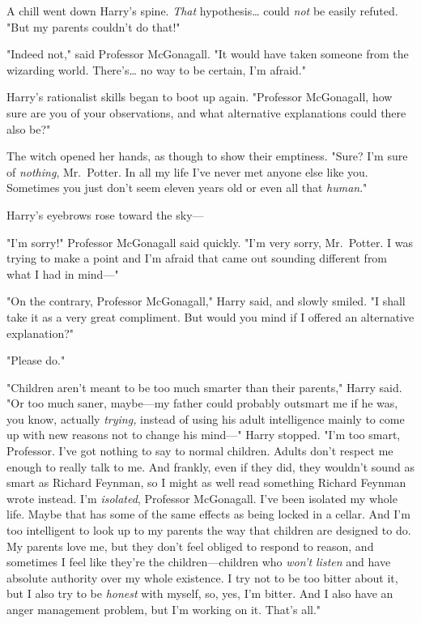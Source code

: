 A chill went down Harry's spine. \emph{That} hypothesis{\ldots} could
\emph{not} be easily refuted. "But my parents couldn't do that!"

"Indeed not," said Professor McGonagall. "It would have taken someone from the
wizarding world. There's{\ldots} no way to be certain, I'm afraid."

Harry's rationalist skills began to boot up again. "Professor McGonagall, how
sure are you of your observations, and what alternative explanations could
there also be?"

The witch opened her hands, as though to show their emptiness. "Sure? I'm sure
of \emph{nothing}, Mr.~Potter. In all my life I've never met anyone else like
you. Sometimes you just don't seem eleven years old or even all that
\emph{human}."

Harry's eyebrows rose toward the sky---

"I'm sorry!" Professor McGonagall said quickly. "I'm very sorry, Mr.~Potter. I
was trying to make a point and I'm afraid that came out sounding different from
what I had in mind---"

"On the contrary, Professor McGonagall," Harry said, and slowly smiled. "I
shall take it as a very great compliment. But would you mind if I offered an
alternative explanation?"

"Please do."

"Children aren't meant to be too much smarter than their parents," Harry said.
"Or too much saner, maybe---my father could probably outsmart me if he was, you
know, actually \emph{trying,} instead of using his adult intelligence mainly to
come up with new reasons not to change his mind---" Harry stopped. "I'm too
smart, Professor. I've got nothing to say to normal children. Adults don't
respect me enough to really talk to me. And frankly, even if they did, they
wouldn't sound as smart as Richard Feynman, so I might as well read something
Richard Feynman wrote instead. I'm \emph{isolated}, Professor McGonagall. I've
been isolated my whole life. Maybe that has some of the same effects as being
locked in a cellar. And I'm too intelligent to look up to my parents the way
that children are designed to do. My parents love me, but they don't feel
obliged to respond to reason, and sometimes I feel like they're the
children---children who \emph{won't listen} and have absolute authority over my
whole existence. I try not to be too bitter about it, but I also try to be
\emph{honest} with myself, so, yes, I'm bitter. And I also have an anger
management problem, but I'm working on it. That's all."


